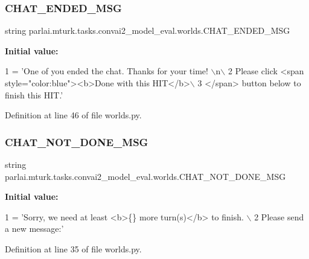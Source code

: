 \subsubsection{\texorpdfstring{C\+H\+A\+T\+\_\+\+E\+N\+D\+E\+D\+\_\+\+M\+SG}{CHAT\_ENDED\_MSG}}
{\footnotesize\ttfamily string parlai.\+mturk.\+tasks.\+convai2\+\_\+model\+\_\+eval.\+worlds.\+C\+H\+A\+T\+\_\+\+E\+N\+D\+E\+D\+\_\+\+M\+SG}

{\bfseries Initial value\+:}
\begin{DoxyCode}
1 =  \textcolor{stringliteral}{'One of you ended the chat. Thanks for your time! \(\backslash\)n\(\backslash\)}
2 \textcolor{stringliteral}{        Please click <span style="color:blue"><b>Done with this HIT</b>\(\backslash\)}
3 \textcolor{stringliteral}{        </span> button below to finish this HIT.'}
\end{DoxyCode}


Definition at line 46 of file worlds.\+py.

\mbox{\label{namespaceparlai_1_1mturk_1_1tasks_1_1convai2__model__eval_1_1worlds_ac441239499c2cfd8169d5dc71b712b63}} 
\subsubsection{\texorpdfstring{C\+H\+A\+T\+\_\+\+N\+O\+T\+\_\+\+D\+O\+N\+E\+\_\+\+M\+SG}{CHAT\_NOT\_DONE\_MSG}}
{\footnotesize\ttfamily string parlai.\+mturk.\+tasks.\+convai2\+\_\+model\+\_\+eval.\+worlds.\+C\+H\+A\+T\+\_\+\+N\+O\+T\+\_\+\+D\+O\+N\+E\+\_\+\+M\+SG}

{\bfseries Initial value\+:}
\begin{DoxyCode}
1 =  \textcolor{stringliteral}{'Sorry, we need at least <b>\{\} more turn(s)</b> to finish. \(\backslash\)}
2 \textcolor{stringliteral}{       Please send a new message:'}
\end{DoxyCode}


Definition at line 35 of file worlds.\+py.

